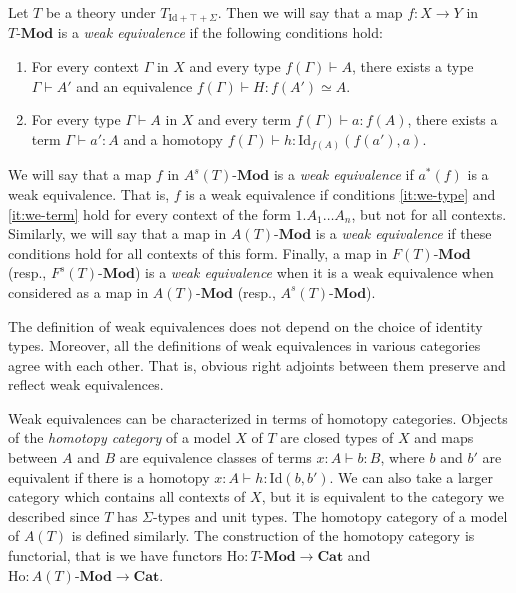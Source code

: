 \documentclass[reqno]{amsart}
\theoremstyle{definition}
\theoremstyle{remark}
\newcommand{\fs}[1]{\mathrm{#1}}
\newcommand{\bcat}[1]{\mathbf{#1}}
\newcommand{\Mod}[1]{#1\text{-}\bcat{Mod}}
\numberwithin{figure}{section}
\begin{document}
Let $T$ be a theory under $T_{\fs{Id} + \top + \Sigma}$.
Then we will say that a map $f : X \to Y$ in $\Mod{T}$ is a \emph{weak equivalence} if the following conditions hold:
\begin{enumerate}
\item \label{it:we-type} For every context $\Gamma$ in $X$ and every type $f(\Gamma) \vdash A$, there exists a type $\Gamma \vdash A'$ and an equivalence $f(\Gamma) \vdash H : f(A') \simeq A$.
\item \label{it:we-term} For every type $\Gamma \vdash A$ in $X$ and every term $f(\Gamma) \vdash a : f(A)$, there exists a term $\Gamma \vdash a' : A$ and a homotopy $f(\Gamma) \vdash h : \fs{Id}_{f(A)}(f(a'),a)$.
\end{enumerate}

We will say that a map $f$ in $\Mod{A^s(T)}$ is a \emph{weak equivalence} if $a^*(f)$ is a weak equivalence.
That is, $f$ is a weak equivalence if conditions \eqref{it:we-type} and \eqref{it:we-term} hold for every context of the form $1.A_1 \ldots A_n$, but not for all contexts.
Similarly, we will say that a map in $\Mod{A(T)}$ is a \emph{weak equivalence} if these conditions hold for all contexts of this form.
Finally, a map in $\Mod{F(T)}$ (resp., $\Mod{F^s(T)}$) is a \emph{weak equivalence} when it is a weak equivalence when considered as a map in $\Mod{A(T)}$ (resp., $\Mod{A^s(T)}$).

\begin{remark}[std-we]
The definition of weak equivalences does not depend on the choice of identity types.
Moreover, all the definitions of weak equivalences in various categories agree with each other.
That is, obvious right adjoints between them preserve and reflect weak equivalences.
\end{remark}

Weak equivalences can be characterized in terms of homotopy categories.
Objects of the \emph{homotopy category} of a model $X$ of $T$ are closed types of $X$ and maps between $A$ and $B$ are equivalence classes of terms $x : A \vdash b : B$,
where $b$ and $b'$ are equivalent if there is a homotopy $x : A \vdash h : \fs{Id}(b,b')$.
We can also take a larger category which contains all contexts of $X$, but it is equivalent to the category we described since $T$ has $\Sigma$-types and unit types.
The homotopy category of a model of $A(T)$ is defined similarly.
The construction of the homotopy category is functorial, that is we have functors $\fs{Ho} : \Mod{T} \to \bcat{Cat}$ and $\fs{Ho} : \Mod{A(T)} \to \bcat{Cat}$.
\end{document}
